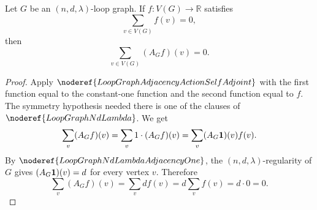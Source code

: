 \begin{helper}
Let \(G\) be an \((n,d,\lambda)\)-loop graph. If \(f\colon V(G)\to\mathbb R\) satisfies
\[
  \sum_{v\in V(G)}f(v)=0,
\]
then
\[
  \sum_{v\in V(G)}(A_Gf)(v)=0.
\]
\end{helper}
\begin{proof}
Apply \(\noderef{LoopGraphAdjacencyActionSelfAdjoint}\) with the first function equal to the constant-one function and the second function equal to \(f\). The symmetry hypothesis needed there is one of the clauses of \(\noderef{LoopGraphNdLambda}\). We get
\[
  \sum_v (A_Gf)(v)
  =
  \sum_v 1\cdot (A_Gf)(v)
  =
  \sum_v (A_G{\bf 1})(v)f(v).
\]
By \(\noderef{LoopGraphNdLambdaAdjacencyOne}\), the \((n,d,\lambda)\)-regularity of \(G\) gives \((A_G{\bf 1})(v)=d\) for every vertex \(v\). Therefore
\[
  \sum_v (A_Gf)(v)
  =
  \sum_v d f(v)
  =
  d\sum_v f(v)
  =
  d\cdot 0
  =
  0.
\]
\end{proof}
